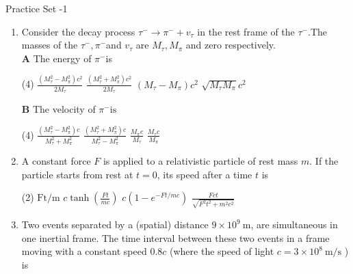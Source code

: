 \newpage
\begin{abox}
	Practice Set -1
	\end{abox}
\begin{enumerate}
	\item Consider the decay process $\tau^{-} \rightarrow \pi^{-}+v_{\tau}$ in the rest frame of the $\tau^{-} .$The masses of the $\tau^{-}, \pi^{-}$and $v_{\tau}$ are $M_{\tau}, M_{\pi}$ and zero respectively.\\
	\textbf{A} The energy of $\pi^{-}$is
	{}
\begin{tasks}(4)
	\task[\textbf{A.}] $\frac{\left(M_{\tau}^{2}-M_{\pi}^{2}\right) c^{2}}{2 M_{\tau}}$
	\task[\textbf{B.}]$\frac{\left(M_{\tau}^{2}+M_{\pi}^{2}\right) c^{2}}{2 M_{\tau}}$
	\task[\textbf{C.}]$\left(M_{\tau}-M_{\pi}\right) c^{2}$
	\task[\textbf{D.}]$\sqrt{M_{\tau} M_{\pi}} c^{2}$
\end{tasks}
\textbf{B} The velocity of  $\pi^{-} \text {is }$
\begin{tasks}(4)
	\task[\textbf{A.}] $\frac{\left(M_{\tau}^{2}-M_{\pi}^{2}\right) c}{M_{\tau}^{2}+M_{\pi}^{2}}$
	\task[\textbf{B.}]$\frac{\left(M_{\tau}^{2}+M_{\pi}^{2}\right) c}{M_{\tau}^{2}-M_{\pi}^{2}}$ 
	\task[\textbf{C.}] $\frac{M_{\pi} c}{M_{\tau}}$
	\task[\textbf{D.}]$\frac{M_{\tau} c}{M_{\pi}}$
\end{tasks}
	\item A constant force $F$ is applied to a relativistic particle of rest mass $m$. If the particle starts from rest at $t=0$, its speed after a time $t$ is
	{}

\begin{tasks}(2)
	\task[\textbf{A.}] $\mathrm{Ft} / \mathrm{m}$
	\task[\textbf{B.}]$c \tanh \left(\frac{F t}{m c}\right)$
	\task[\textbf{C.}]$c\left(1-e^{-F t / m c}\right)$
	\task[\textbf{D.}]$\frac{F c t}{\sqrt{F^{2} t^{2}+m^{2} c^{2}}}$
\end{tasks}
	\item Two events separated by a (spatial) distance $9 \times 10^{9} \mathrm{~m}$, are simultaneous in one inertial frame. The time interval between these two events in a frame moving with a constant speed $0.8 c$ (where the speed of light $c=3 \times 10^{8} \mathrm{~m} / \mathrm{s}$ ) is
	{}


\end{enumerate}

